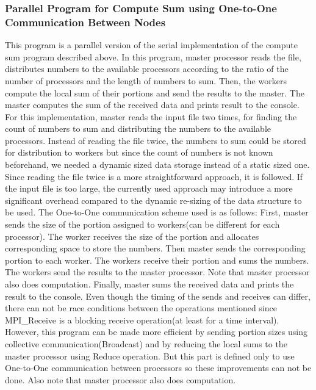 \documentclass{article}
\begin{document}
\subsubsection{Parallel Program for Compute Sum using One-to-One Communication Between Nodes}
\qquad This program is a parallel version of the serial implementation of the compute sum program described above. In this program, master processor reads the file, distributes numbers to the available processors according to the ratio of the number of processors and the length of numbers to sum. Then, the workers compute the local sum of their portions and send the results to the master. The master computes the sum of the received data and prints result to the console. For this implementation, master reads the input file two times, for finding the count of numbers to sum and distributing the numbers to the available processors. Instead of reading the file twice, the numbers to sum could be stored for distribution to workers but since the count of numbers is not known beforehand, we needed a dynamic sized data storage instead of a static sized one. Since reading the file twice is a more straightforward approach, it is followed. If the input file is too large, the currently used approach may introduce a more significant overhead compared to the dynamic re-sizing of the data structure to be used. The One-to-One communication scheme used is as follows: First, master sends the size of the portion assigned to workers(can be different for each processor). The worker receives the size of the portion and allocates corresponding space to store the numbers. Then master sends the corresponding portion to each worker. The workers receive their portion and sums the numbers. The workers send the results to the master processor. Note that master processor also does computation. Finally, master sums the received data and prints the result to the console. Even though the timing of the sends and receives can differ, there can not be race conditions between the operations mentioned since MPI\_Receive is a blocking receive operation(at least for a time interval). However, this program can be made more efficient by sending portion sizes using collective communication(Broadcast) and by reducing the local sums to the master processor using Reduce operation. But this part is defined only to use One-to-One communication between processors so these improvements can not be done. Also note that master processor also does computation.
\end{document}
